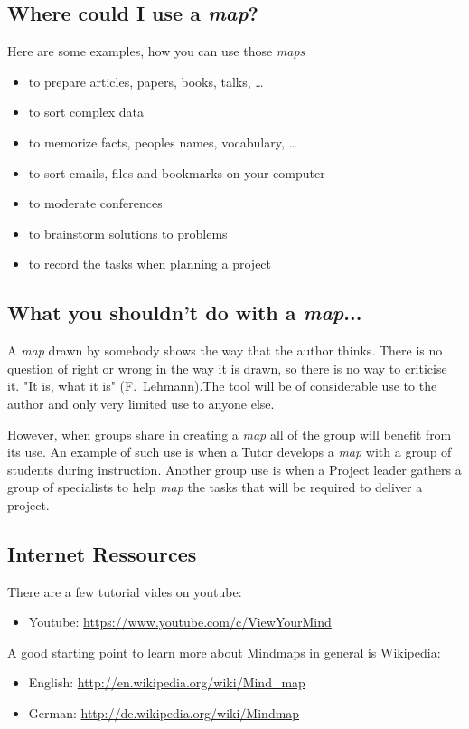 \documentclass[12pt,a4paper]{article}
\begin{document}
\subsection{Where could I use a {\em map}?}
Here are some examples, how you can use those {\em maps}
\begin{itemize}
    \item to prepare articles, papers, books, talks, \ldots
    \item to sort complex data
    \item to memorize facts, peoples names, vocabulary, \ldots
    \item to sort emails, files and bookmarks on your computer
    \item to moderate conferences
    \item to brainstorm solutions to problems
    \item to record the tasks when planning a project
\end{itemize}

\subsection{What you shouldn't do with a {\em map}...}
A {\em map} drawn by somebody shows the way that the author thinks.
There is no question of right or wrong in the way it is drawn, so there
is no way to criticise it. "It is, what it is" ({\sc F.~Lehmann}).The
tool will be of considerable use to the author and only very limited use
to anyone else. 

However, when groups share in creating a {\em map} all of the group will
benefit from its use. An example of such use is when a Tutor develops a
{\em map} with a group of students during instruction. Another group use
is when a Project leader gathers a group of specialists to help {\em
map} the tasks that will be required to deliver a project.


\subsection{Internet Ressources} 
There are a few tutorial vides on youtube:
\begin{itemize}
    \item Youtube: 
        \href{https://www.youtube.com/c/ViewYourMind}{https://www.youtube.com/c/ViewYourMind}
\end{itemize}
A good starting point to learn more about Mindmaps in general is Wikipedia:
\begin{itemize}
    \item English: 
        \href{http://en.wikipedia.org/wiki/Mind_map}{http://en.wikipedia.org/wiki/Mind\_map}
    \item German: 
        \href{http://de.wikipedia.org/wiki/Mindmap}{http://de.wikipedia.org/wiki/Mindmap}
\end{itemize}
\end{document}
